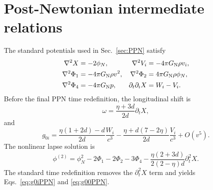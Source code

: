 \documentclass[11pt]{article}
\newcommand{\GN}{G_{\rm N}}
\begin{document}
\section{Post-Newtonian intermediate relations}

The standard potentials used in Sec.~\ref{sec:PPN} satisfy
\begin{align}
\nabla^2X&=-2\phi_N,&
\nabla^2V_i&=-4\pi\GN\rho v_i,\nonumber\\
\nabla^2\Phi_1&=-4\pi\GN\rho v^2,&
\nabla^2\Phi_2&=4\pi\GN\rho\phi_N,\nonumber\\
\nabla^2\Phi_4&=-4\pi\GN p,&
\partial_t\partial_iX&=W_i-V_i.
\end{align}
Before the final PPN time redefinition, the longitudinal shift is
\begin{equation}
\omega=\frac{\eta+3d}{2d}\partial_tX,
\end{equation}
and
\begin{equation}
g_{0i}=\frac{\eta(1+2d)-d}{2d}\frac{W_i}{c^3}
-\frac{\eta+d(7-2\eta)}{2d}\frac{V_i}{c^3}+O(v^5).
\end{equation}
The nonlinear lapse solution is
\begin{equation}
\phi^{(2)}=\phi_N^2-2\Phi_1-2\Phi_2-3\Phi_4
-\frac{\eta(2+3d)}{2(2-\eta)d}\partial_t^2X.
\end{equation}
The standard time redefinition removes the $\partial_t^2X$ term and yields Eqs.~\eqref{eq:g0iPPN} and \eqref{eq:g00PPN}.
\end{document}
